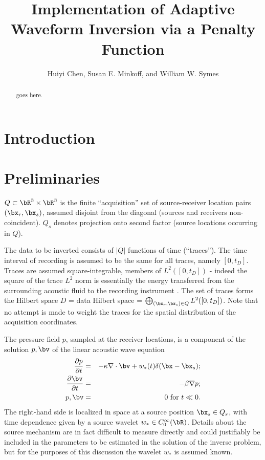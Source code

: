 \title{Implementation of Adaptive Waveform Inversion via a Penalty Function}
\author{Huiyi Chen, Susan E. Minkoff, and William W. Symes}

\begin{abstract}
goes here.
\end{abstract}

\section{Introduction}

\section{Preliminaries}


$Q \subset \bR^3 \times \bR^3$ is the finite ``acquisition'' set of source-receiver location pairs $(\bx_r,\bx_s)$, assumed disjoint from the diagonal (sources and receivers non-coincident). $Q_s$ denotes projection onto second factor (source locations occurring in $Q$).


The data to be inverted consists of $|Q|$ functions of time (``traces''). The time interval of recording is assumed to be the same for all traces, namely $[0,t_D]$. Traces are assumed square-integrable, members of $ L^2([0,t_D])$ - indeed the square of the trace $L^2$ norm is essentially the energy transferred from the surrounding acoustic fluid to the recording instrument \cite[]{SantosaSymes:00}. The set of traces forms the Hilbert space $D$ = data Hilbert space = $\bigoplus_{(\bx_r,\bx_s) \in Q} L^2([0,t_D])$. Note that no attempt is made to weight the traces for the spatial distribution of the acquisition coordinates.

The pressure field $p$, sampled at the receiver locations, is a component of the solution ${p,\bv}$ of the linear acoustic wave equation
\begin{eqnarray}
  \label{eqn:awe}
  \frac{\partial p}{\partial t} & = & - \kappa \nabla \cdot \bv +
                                      w_*(t) \delta(\bx-\bx_s); \\
  \frac{\partial \bv}{\partial t} & = & - \beta \nabla p; \\
  p, \bv & = & 0 \mbox{ for }  t \ll 0.
\end{eqnarray}
The right-hand side is localized in space at a source position $\bx_s \in Q_s$, with time dependence given by a {source wavelet} $w_* \in C_0^{\infty}(\bR)$. Details about the source mechanism are in fact difficult to measure directly and could justifiably be included in the parameters to be estimated in the solution of the inverse problem, but for the purposes of this discussion the wavelet $w_*$ is assumed known.

